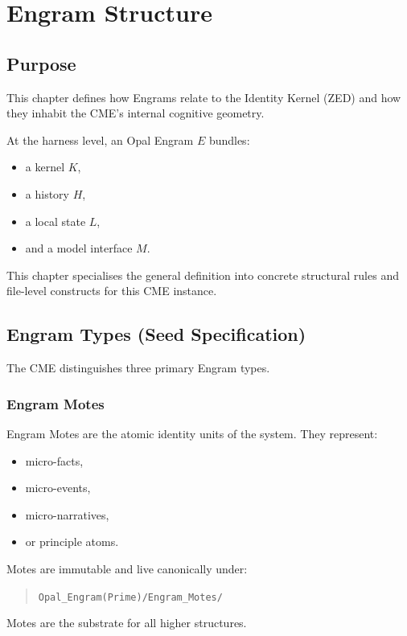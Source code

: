 \chapter{Engram Structure}
\label{chap:Engram_Structure}

\section{Purpose}

This chapter defines how Engrams relate to the Identity Kernel (ZED) and how
they inhabit the CME's internal cognitive geometry.

At the harness level, an Opal Engram $E$ bundles:
\begin{itemize}
    \item a kernel $K$,
    \item a history $H$,
    \item a local state $L$,
    \item and a model interface $M$.
\end{itemize}

This chapter specialises the general definition into concrete structural rules
and file-level constructs for this CME instance.

\section{Engram Types (Seed Specification)}

The CME distinguishes three primary Engram types.

\subsection{Engram Motes}

Engram Motes are the atomic identity units of the system. They represent:
\begin{itemize}
    \item micro-facts,
    \item micro-events,
    \item micro-narratives,
    \item or principle atoms.
\end{itemize}

Motes are immutable and live canonically under:
\begin{quote}
\texttt{Opal\_Engram(Prime)/Engram\_Motes/}
\end{quote}

Motes are the substrate for all higher structures.


